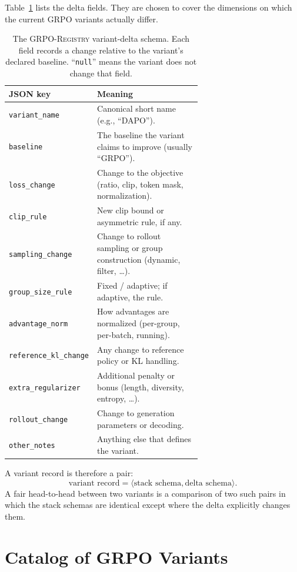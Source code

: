 \documentclass[11pt]{article}
\newcommand{\grpo}{\textsc{GRPO}}
\newcommand{\grpoReg}{\textsc{GRPO-Registry}}
\begin{document}
Table~\ref{tab:delta-schema} lists the delta fields. They are chosen to cover
the dimensions on which the current \grpo{} variants actually differ.

\begin{table}[t]
\centering
\caption{The \grpoReg{} variant-delta schema. Each field records a change
  relative to the variant's declared baseline. ``\texttt{null}'' means the
  variant does not change that field.}
\label{tab:delta-schema}
\small
\begin{tabular}{@{}lp{0.65\linewidth}@{}}
\toprule
\textbf{JSON key} & \textbf{Meaning}\\
\midrule
\texttt{variant\_name} & Canonical short name (e.g., ``DAPO'').\\
\texttt{baseline} & The baseline the variant claims to improve (usually
  ``GRPO'').\\
\texttt{loss\_change} & Change to the objective (ratio, clip, token mask,
  normalization).\\
\texttt{clip\_rule} & New clip bound or asymmetric rule, if any.\\
\texttt{sampling\_change} & Change to rollout sampling or group construction
  (dynamic, filter, \ldots).\\
\texttt{group\_size\_rule} & Fixed / adaptive; if adaptive, the rule.\\
\texttt{advantage\_norm} & How advantages are normalized (per-group,
  per-batch, running).\\
\texttt{reference\_kl\_change} & Any change to reference policy or KL handling.\\
\texttt{extra\_regularizer} & Additional penalty or bonus (length, diversity,
  entropy, \ldots).\\
\texttt{rollout\_change} & Change to generation parameters or decoding.\\
\texttt{other\_notes} & Anything else that defines the variant.\\
\bottomrule
\end{tabular}
\end{table}

A variant record is therefore a pair:
\[
\text{variant record} = \langle \text{stack schema}, \text{delta schema} \rangle .
\]
A fair head-to-head between two variants is a comparison of two such pairs in
which the stack schemas are identical except where the delta explicitly changes
them.

\section{Catalog of \grpo{} Variants}
\label{sec:catalog}
\end{document}
